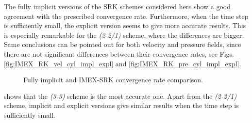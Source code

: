 The fully implicit versions of the SRK schemes considered here show a good agreement with the prescribed convergence rate. Furthermore, when the time step is sufficiently small, the explicit version seems to give more accurate results. This is especially remarkable for the \textit{(2-2/1)} scheme, where the differences are bigger. Same conclusions can be pointed out for both velocity and pressure fields, since there are not significant differences between their convergence rates, see Figs. \ref{fig:IMEX_RK_vel_cyl_impl_expl} and  \ref{fig:IMEX_RK_pre_cyl_impl_expl}. 
\begin{figure}[h!]
  \centering
  \caption{Fully implicit and IMEX-SRK convergence rate comparison.}
  \label{fig-IMEX_RK_cyl_conv_impl_expl}
\end{figure}
 shows that the \textit{(3-3)} scheme is the most accurate one. Apart from the \textit{(2-2/1)} scheme, implicit and explicit versions give similar results when the time step is sufficiently small. 

